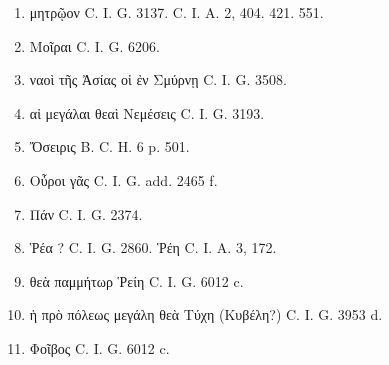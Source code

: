 \documentclass[a4paper, 11pt, oneside, polutonikogreek, german, twocolumn]{article}
\begin{document}
\begin{enumerate}
\item μητρῷον C. I. G. 3137. C. I. A. 2, 404. 421. 551.

\item Μοῖραι C. I. G. 6206.

\item ναοὶ τῆς Ἀσίας οἱ ἐν Σμύρνῃ C. I. G. 3508.

\item αἱ μεγάλαι θεαὶ Νεμέσεις C. I. G. 3193.

\item Ὄσειρις B. C. H. 6 p. 501.

\item Οὖροι γᾶς C. I. G. add. 2465 f.

\item Πάν C. I. G. 2374.

\item Ῥέα ? C. I. G. 2860. Ῥέη C. I. A. 3, 172.

\item θεὰ παμμήτωρ Ῥείη C. I. G. 6012 c.

\item ἡ πρὸ πόλεως μεγάλη θεὰ Τύχη (Κυβέλη?) C. I. G. 3953 d.

\item Φοῖβος C. I. G. 6012 c.
\end{enumerate}
\end{document}
